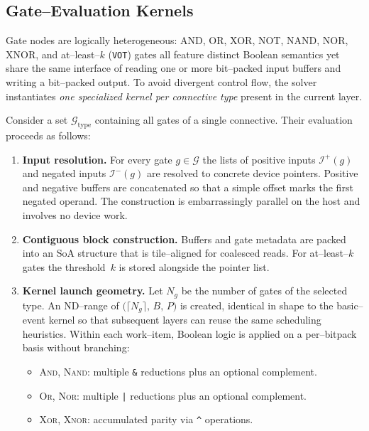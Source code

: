 \subsection{Gate--Evaluation Kernels}
\label{subsec:gate_kernel}

Gate nodes are logically heterogeneous: AND, OR, XOR, NOT, NAND, NOR, XNOR, and
at--least--$k$ (\texttt{VOT}) gates all feature distinct Boolean semantics yet
share the same interface of reading one or more bit--packed input buffers and
writing a bit--packed output.  To avoid divergent control flow, the solver
instantiates \emph{one specialized kernel per connective type} present in the
current layer.

Consider a set $\mathcal{G}_{\mathrm{type}}$ containing all gates of a single
connective.  Their evaluation proceeds as follows:
\begin{enumerate}
  \item \textbf{Input resolution.}  For every gate $g\in\mathcal{G}$ the lists
        of positive inputs $\mathcal{I}^+(g)$ and negated inputs
        $\mathcal{I}^-(g)$ are resolved to concrete device pointers.  Positive
        and negative buffers are concatenated so that a simple offset marks the
        first negated operand.  The construction is embarrassingly parallel on
        the host and involves no device work.
  \item \textbf{Contiguous block construction.}  Buffers and gate metadata are
        packed into an SoA structure that is tile--aligned for
        coalesced reads.  For at--least--$k$ gates the threshold~$k$ is stored
        alongside the pointer list.
  \item \textbf{Kernel launch geometry.}  Let $N_{\!g}$ be the number of gates
        of the selected type.  An ND--range of
        $\bigl(\lceil N_{\!g}\rceil,\,B,\,P\bigr)$ is created, identical in
        shape to the basic--event kernel so that subsequent layers can reuse
        the same scheduling heuristics.  Within each work--item, Boolean logic
        is applied on a per--bitpack basis without branching:
        \begin{itemize}
          \item \textsc{And}, \textsc{Nand}:  multiple \texttt{\&} reductions
                plus an optional complement.
          \item \textsc{Or}, \textsc{Nor}:   multiple \texttt{|} reductions
                plus an optional complement.
          \item \textsc{Xor}, \textsc{Xnor}: accumulated parity via \texttt{\^{}} operations.

\end{itemize}
\end{enumerate}
